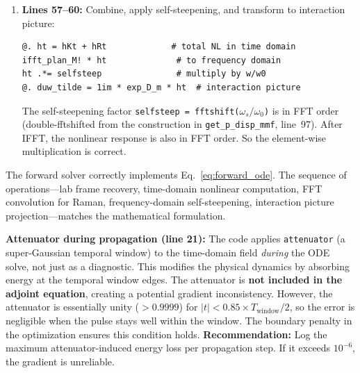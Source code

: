 \documentclass[12pt,a4paper]{article}
\newcommand{\FFT}{\operatorname{FFT}}
\newcommand{\IFFT}{\operatorname{IFFT}}
\theoremstyle{definition}
\begin{document}
\begin{enumerate}[leftmargin=*]
The convolution theorem gives $h_R * |u|^2 = \IFFT[\hat{h}_R \cdot \FFT[|u|^2]]$. The \texttt{fftshift!} on line~50 corrects for the fact that both $h_R(t)$ and $|u(t)|^2$ are stored in centered time ordering (symmetric about $t=0$), and circular convolution of centered arrays requires an \texttt{fftshift} of the output.

\item \textbf{Lines 57--60:} Combine, apply self-steepening, and transform to interaction picture:
\begin{lstlisting}
@. ht = hKt + hRt             # total NL in time domain
ifft_plan_M! * ht              # to frequency domain
ht .*= selfsteep               # multiply by w/w0
@. duw_tilde = 1im * exp_D_m * ht  # interaction picture
\end{lstlisting}

The self-steepening factor \texttt{selfsteep = fftshift($\omega_s / \omega_0$)} is in FFT order (double-fftshifted from the construction in \texttt{get\_p\_disp\_mmf}, line~97). After IFFT, the nonlinear response is also in FFT order. So the element-wise multiplication is correct.
\end{enumerate}

\begin{verified}
The forward solver correctly implements Eq.~\eqref{eq:forward_ode}. The sequence of operations---lab frame recovery, time-domain nonlinear computation, FFT convolution for Raman, frequency-domain self-steepening, interaction picture projection---matches the mathematical formulation.
\end{verified}

\begin{flagged}
\textbf{Attenuator during propagation (line 21):} The code applies \texttt{attenuator} (a super-Gaussian temporal window) to the time-domain field \emph{during} the ODE solve, not just as a diagnostic. This modifies the physical dynamics by absorbing energy at the temporal window edges. The attenuator is \textbf{not included in the adjoint equation}, creating a potential gradient inconsistency. However, the attenuator is essentially unity ($>0.9999$) for $|t| < 0.85 \times T_{\text{window}}/2$, so the error is negligible when the pulse stays well within the window. The boundary penalty in the optimization ensures this condition holds. \textbf{Recommendation:} Log the maximum attenuator-induced energy loss per propagation step. If it exceeds $10^{-6}$, the gradient is unreliable.
\end{flagged}
\end{document}
